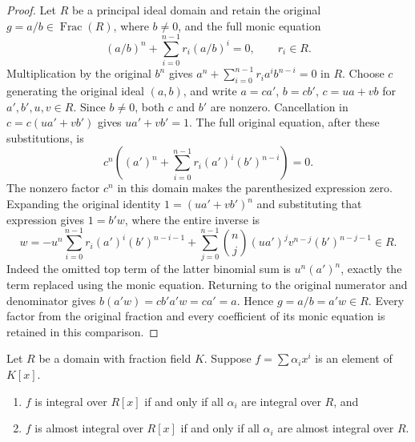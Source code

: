 \begin{proof}
Let $R$ be a principal ideal domain and retain the original
$g=a/b\in\operatorname{Frac}(R)$, where $b\ne0$, and the full
monic equation
$$
(a/b)^n+\sum_{i=0}^{n-1}r_i(a/b)^i=0,\qquad r_i\in R.
$$
Multiplication by the original $b^n$ gives
$a^n+\sum_{i=0}^{n-1}r_i a^i b^{n-i}=0$ in $R$.
Choose $c$ generating the original ideal $(a,b)$, and write
$a=ca'$, $b=cb'$, $c=ua+vb$ for $a',b',u,v\in R$.
Since $b\ne0$, both $c$ and $b'$ are nonzero. Cancellation in
$c=c(ua'+vb')$ gives $ua'+vb'=1$.
The full original equation, after these substitutions, is
$$
c^n\left((a')^n+\sum_{i=0}^{n-1}r_i(a')^i(b')^{n-i}\right)=0.
$$
The nonzero factor $c^n$ in this domain makes the parenthesized
expression zero. Expanding the original identity
$1=(ua'+vb')^n$ and substituting that expression gives $1=b'w$,
where the entire inverse is
$$
w=-u^n\sum_{i=0}^{n-1}r_i(a')^i(b')^{n-i-1}
+\sum_{j=0}^{n-1}\binom nj(ua')^jv^{n-j}(b')^{n-j-1}\in R.
$$
Indeed the omitted top term of the latter binomial sum is
$u^n(a')^n$, exactly the term replaced using the monic equation.
Returning to the original numerator and denominator gives
$b(a'w)=cb'a'w=ca'=a$. Hence $g=a/b=a'w\in R$.
Every factor from the original fraction and every coefficient
of its monic equation is retained in this comparison.
\end{proof}

\begin{lemma}
\label{editorial-source-lemma-prepare-polynomial-ring-normal}
Let $R$ be a domain with fraction field $K$.
Suppose $f = \sum \alpha_i x^i$ is an
element of $K[x]$.
\begin{enumerate}
\item $f$ is integral over $R[x]$ if and only if
all $\alpha_i$ are integral over $R$, and
\item $f$ is almost integral over $R[x]$ if and only if
all $\alpha_i$ are almost integral over $R$.
\end{enumerate}
\end{lemma}


